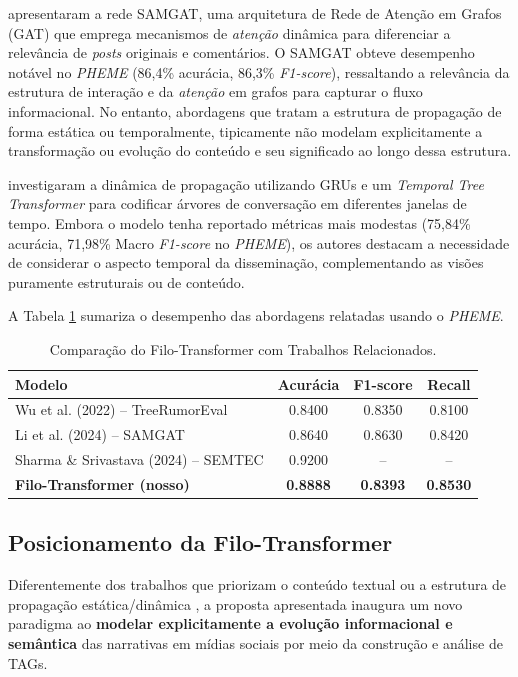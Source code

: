 \documentclass[12pt]{article}
\begin{document}
\cite{li2024samgat} apresentaram a rede SAMGAT, uma arquitetura de Rede de Atenção em Grafos (GAT) que emprega mecanismos de \textit{atenção} dinâmica para diferenciar a relevância de \textit{posts} originais e comentários. O SAMGAT obteve desempenho notável no \textit{PHEME} (86,4\% acurácia, 86,3\% \textit{F1-score}), ressaltando a relevância da estrutura de interação e da \textit{atenção} em grafos para capturar o fluxo informacional. No entanto, abordagens que tratam a estrutura de propagação de forma estática ou temporalmente, tipicamente não modelam explicitamente a transformação ou evolução do conteúdo e seu significado ao longo dessa estrutura.

\cite{wu2025rumor} investigaram a dinâmica de propagação utilizando GRUs e um \textit{Temporal Tree Transformer} para codificar árvores de conversação em diferentes janelas de tempo. Embora o modelo tenha reportado métricas mais modestas (75,84\% acurácia, 71,98\% Macro \textit{F1-score} no \textit{PHEME}), os autores destacam a necessidade de considerar o aspecto temporal da disseminação, complementando as visões puramente estruturais ou de conteúdo.

A Tabela \ref{tab:comparacao-trabalhos-relacionados} sumariza o desempenho das abordagens relatadas usando o \textit{PHEME}.

\begin{table}[htb]
\centering
\caption{Comparação do Filo-Transformer com Trabalhos Relacionados.}
\label{tab:comparacao-trabalhos-relacionados}
\begin{tabular}{p{5cm}ccc}
\toprule
\textbf{Modelo} & \textbf{Acurácia} & \textbf{F1-score} & \textbf{Recall} \\
\midrule
Wu et al. (2022) – TreeRumorEval & 0.8400 & 0.8350 & 0.8100 \\
Li et al. (2024) – SAMGAT & 0.8640 & 0.8630 & 0.8420 \\
Sharma \& Srivastava (2024) – SEMTEC & 0.9200 & -- & -- \\
\textbf{Filo-Transformer (nosso)} & \textbf{0.8888} & \textbf{0.8393} & \textbf{0.8530} \\
\bottomrule
\end{tabular}
\end{table}

\subsection{Posicionamento da Filo-Transformer}
Diferentemente dos trabalhos que priorizam o conteúdo textual \cite{sharma2024semtec} ou a estrutura de propagação estática/dinâmica \cite{li2024samgat, wu2025rumor}, a proposta apresentada inaugura um novo paradigma ao \textbf{modelar explicitamente a evolução informacional e semântica} das narrativas em mídias sociais por meio da construção e análise de TAGs.
\end{document}
